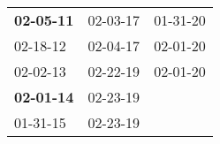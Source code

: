 \begin{supertabular}{p{0.33\columnwidth}p{0.33\columnwidth}p{0.33\columnwidth}}
 \textbf{02-05-11\textsuperscript{}} &  02-03-17\textsuperscript{} &  01-31-20\textsuperscript{} \\
          02-18-12\textsuperscript{} &  02-04-17\textsuperscript{} &  02-01-20\textsuperscript{} \\
          02-02-13\textsuperscript{} &  02-22-19\textsuperscript{} &  02-01-20\textsuperscript{} \\
 \textbf{02-01-14\textsuperscript{}} &  02-23-19\textsuperscript{} &                             \\
          01-31-15\textsuperscript{} &  02-23-19\textsuperscript{} &                             \\
\end{supertabular}
